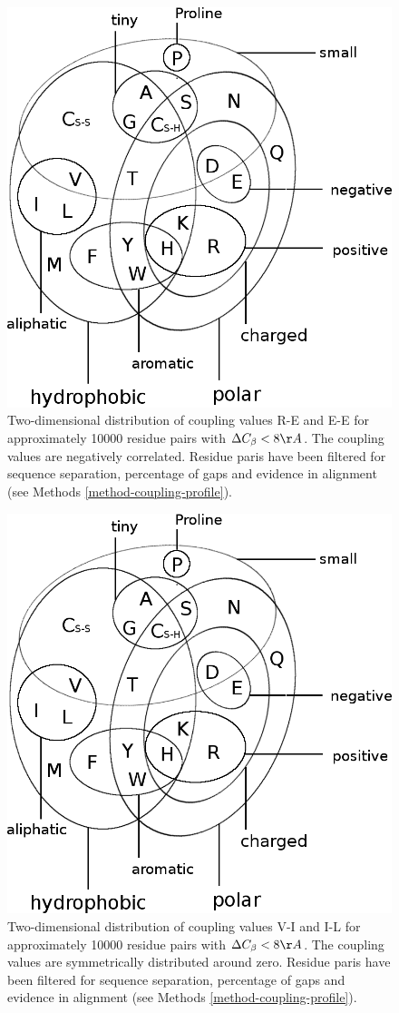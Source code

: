 \documentclass[12pt,a4paper,twoside]{book}
\newcommand{\Cb}{C_\beta}
\theoremstyle{definition}
\theoremstyle{definition}
\theoremstyle{remark}
\begin{document}
\begin{figure}
\includegraphics[width=0.75\linewidth]{img/amino_acid_physico_chemical_properties_venn_diagramm} \caption{Two-dimensional distribution
of coupling values R-E and E-E for approximately 10000 residue pairs
with \(\Delta\Cb < 8\AA\). The coupling values are negatively
correlated. Residue paris have been filtered for sequence separation,
percentage of gaps and evidence in alignment (see Methods
\ref{method-coupling-profile}).}\label{fig:2d-coupling-profile-re-ee-0-8}
\end{figure}








\begin{figure}
\includegraphics[width=0.75\linewidth]{img/amino_acid_physico_chemical_properties_venn_diagramm} \caption{Two-dimensional distribution
of coupling values V-I and I-L for approximately 10000 residue pairs
with \(\Delta\Cb < 8\AA\). The coupling values are symmetrically
distributed around zero. Residue paris have been filtered for sequence
separation, percentage of gaps and evidence in alignment (see Methods
\ref{method-coupling-profile}).}\label{fig:2d-coupling-profile-vi-il-0-8}
\end{figure}
\end{document}
